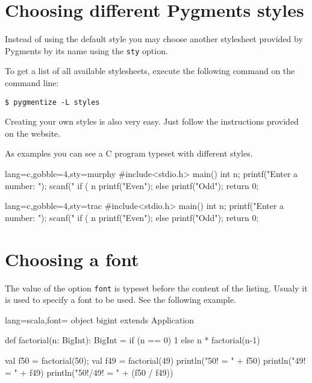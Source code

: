 \documentclass[10pt,a4paper]{article}
\begin{document}
\begin{Example}
\end{Example}

\section{Choosing different Pygments styles}

Instead of using the default style you may choose another stylesheet
provided by Pygments by its name using the \verb|sty| option.

To get a list of all available stylesheets, execute the following
command on the command line:
\begin{verbatim}
$ pygmentize -L styles
\end{verbatim}

Creating your own styles is also very easy. Just follow the instructions
provided on the website.

As examples you can see a C program typeset with different styles.

\begin{Example}
\noindent
\begin{minipage}{t0.49\linewidth}
\begin{pygmented}{lang=c,gobble=4,sty=murphy}
#include<stdio.h>
main()
{ int n;
printf("Enter a number: ");
scanf("%
if ( n%
printf("Even\n");
else
printf("Odd\n");
return 0;
}
\end{pygmented}
\end{minipage}
\hfil
\begin{minipage}{t0.49\linewidth}
\begin{pygmented}{lang=c,gobble=4,sty=trac}
#include<stdio.h>
main()
{ int n;
printf("Enter a number: ");
scanf("%
if ( n%
printf("Even\n");
else
printf("Odd\n");
return 0;
}
\end{pygmented}
\end{minipage}
\end{Example}

\section{Choosing a font}

The value of the option \verb|font| is typeset before the content of the
listing. Usualy it is used to specify a font to be used. See the
following example.

\begin{Example}
\begin{pygmented}{lang=scala,font=\rmfamily\scshape\large}
object bigint extends Application {
def factorial(n: BigInt): BigInt =
if (n == 0) 1 else n * factorial(n-1)

val f50 = factorial(50); val f49 = factorial(49)
println("50! = " + f50)
println("49! = " + f49)
println("50!/49! = " + (f50 / f49))
}
\end{pygmented}
\end{Example}
\end{document}

